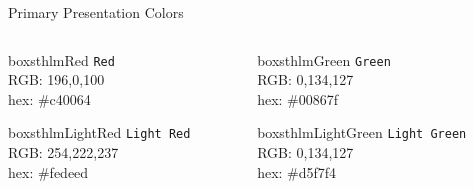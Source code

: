 \documentclass[newPxFont]{beamer}
\begin{document}
\begin{frame}[c]{Primary Presentation Colors}
\begin{columns}[c]
\begin{column}{0.23\textwidth}

\begin{beamercolorbox}[wd=\linewidth,ht=10ex,dp=3ex]{boxsthlmRed}
\centering
	\texttt{Red}\\
	\vspace{1em}
	\tiny{RGB:  196,0,100} \\
	\tiny{hex: \#c40064}
\end{beamercolorbox}

\vspace{3em}

\begin{beamercolorbox}[wd=\linewidth,ht=10ex,dp=3ex]{boxsthlmLightRed}
\centering
	\texttt{Light Red}\\
	\vspace{1em}
	\tiny{RGB:  254,222,237} \\
	\tiny{hex: \#fedeed}
\end{beamercolorbox}
\end{column}


\begin{column}{0.23\textwidth}
\begin{beamercolorbox}[wd=\linewidth,ht=10ex,dp=3ex]{boxsthlmGreen}
\centering
	\texttt{Green}\\
	\vspace{1em}
	\tiny{RGB:  0,134,127} \\
	\tiny{hex: \#00867f}
\end{beamercolorbox}

\vspace{3em}

\begin{beamercolorbox}[wd=\linewidth,ht=10ex,dp=3ex]{boxsthlmLightGreen}
\centering
	\texttt{Light Green}\\
	\vspace{1em}
	\tiny{RGB:  0,134,127} \\
	\tiny{hex: \#d5f7f4}
\end{beamercolorbox}
\end{column}
\end{columns}


\end{frame}
\end{document}
